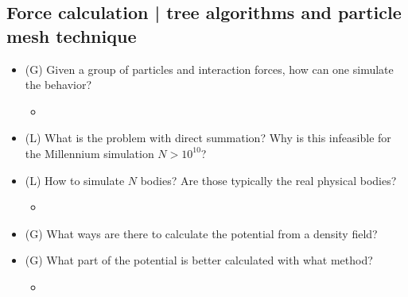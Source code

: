 \subsection*{Force calculation | tree algorithms and particle mesh technique}

\begin{itemize}
    \item (G) Given a group of particles and interaction forces, how can one simulate the behavior?
    \begin{itemize}
        \item {}
    \end{itemize}
    \answerboxS
    \item (L) What is the problem with direct summation? Why is this infeasible for the Millennium simulation $N > 10^{10}$?
    \answerboxS
    \item (L) How to simulate $N$ bodies? Are those typically the real physical bodies?
    \begin{itemize}
        \item {}
    \end{itemize}
    \answerboxM
    \item (G) What ways are there to calculate the potential from a density field?
    \answerboxM
    \item (G) What part of the potential is better calculated with what method?
    \begin{itemize}
        \item {}
    \end{itemize}
    \answerboxM
\end{itemize}

